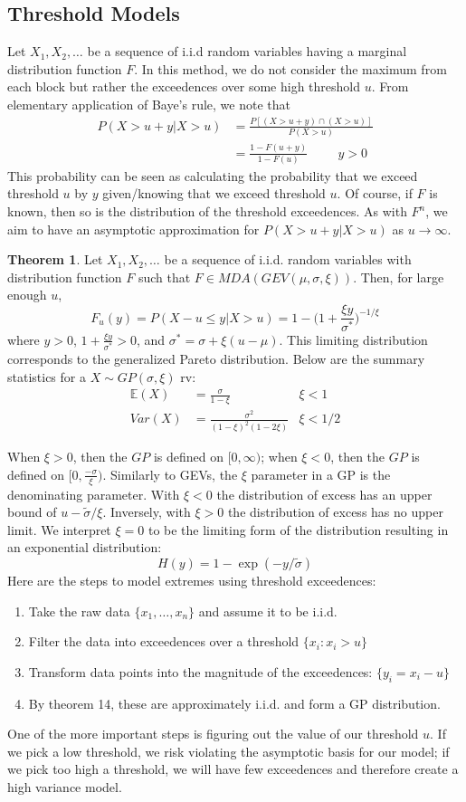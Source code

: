 \documentclass{article}
\theoremstyle{definition}
\newtheorem{theorem}{Theorem}
\theoremstyle{definition}
\def\E{\mathbb{E}}
\def\xs{\{x_1, \hdots, x_n\}}
\begin{document}
\subsection{Threshold Models}
Let $X_1, X_2, \hdots$ be a sequence of i.i.d random variables having a marginal distribution function $F$. In this method, we do not consider the maximum from each block but rather the exceedences over some high threshold $u$. From elementary application of Baye's rule, we note that 
\begin{align*}
    P(X>u+y|X>u)&=\frac{P[(X>u+y)\cap (X>u)]}{P(X>u)}\\
    &=\frac{1-F(u+y)}{1-F(u)} \hspace{1cm} y>0
\end{align*}
This probability can be seen as calculating the probability that we exceed threshold $u$ by $y$ given/knowing that we exceed threshold $u$. Of course, if $F$ is known, then so is the distribution of the threshold exceedences. As with $F^n$, we aim to have an asymptotic approximation for $P(X>u+y|X>u)$ as $u \rightarrow \infty$.
\begin{theorem}
Let $X_1,X_2,\hdots$ be a sequence of i.i.d. random variables with distribution function $F$ such that $F\in MDA(GEV(\mu,\sigma, \xi))$. Then, for large enough $u$,
\[F_u(y)= P(X-u\leq y|X>u)= 1-\bigg(1+\frac{\xi y}{\sigma^*} \bigg)^{-1/\xi}\]
where $y>0$, $1+\frac{\xi y}{\sigma^*} >0$, and $\sigma^*= \sigma+ \xi(u-\mu)$.
This limiting distribution corresponds to the generalized Pareto distribution. Below are the summary statistics for a $X\sim GP(\sigma, \xi)$ rv:
\begin{align*}
    \E(X)&=\frac{\sigma}{1-\xi} &\xi<1\\
    Var(X)&= \frac{\sigma^2}{(1-\xi)^2(1-2\xi)}&\xi<1/2
\end{align*}
\end{theorem}
When $\xi>0$, then the $GP$ is defined on $[0,\infty)$; when $\xi<0$, then the $GP$ is defined on $[0,\frac{-\sigma}{\xi})$. Similarly to GEVs, the $\xi$ parameter in a GP is the denominating parameter. With $\xi<0$ the distribution of excess has an upper bound of $u- \tilde{\sigma}/\xi$. Inversely, with $\xi>0$ the distribution of excess has no upper limit. We interpret $\xi=0$ to be the limiting form of the distribution resulting in an exponential distribution:
\[H(y)= 1-\exp(-y/\tilde{\sigma})\]
Here are the steps to model extremes using threshold exceedences:
\begin{enumerate}
    \item Take the raw data $\xs$ and assume it to be i.i.d.
    \item Filter the data into exceedences over a threshold $\{x_i: x_i>u\}$
    \item Transform data points into the magnitude of the exceedences: $\{y_i =x_i-u\}$
    \item By theorem 14, these are approximately i.i.d. and form a GP distribution.
\end{enumerate}
One of the more important steps is figuring out the value of our threshold $u$. If we pick a low threshold, we risk violating the asymptotic basis for our model; if we pick too high a threshold, we will have few exceedences and therefore create a high variance model.
\end{document}
